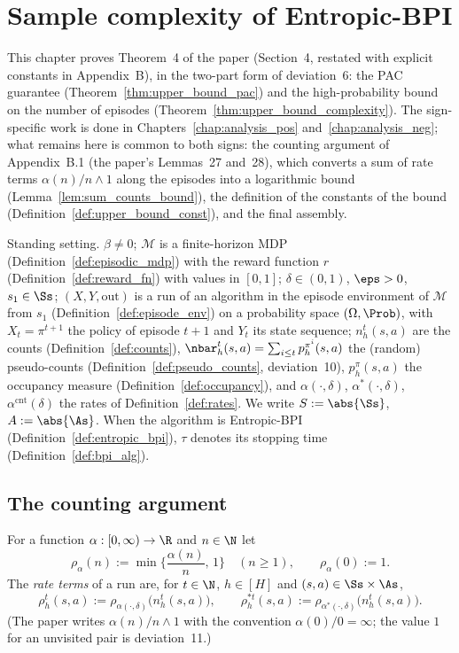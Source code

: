 \chapter{Sample complexity of Entropic-BPI}
\label{chap:sample_complexity}

This chapter proves Theorem~4 of the paper (Section~4, restated with explicit constants in
Appendix~B), in the two-part form of deviation~6: the PAC guarantee
(Theorem~\ref{thm:upper_bound_pac}) and the high-probability bound on the number of episodes
(Theorem~\ref{thm:upper_bound_complexity}). The sign-specific work is done in
Chapters~\ref{chap:analysis_pos} and~\ref{chap:analysis_neg}; what remains here is common to
both signs: the counting argument of Appendix~B.1 (the paper's Lemmas~27 and~28), which
converts a sum of rate terms $\alpha(n)/n \wedge 1$ along the episodes into a logarithmic
bound (Lemma~\ref{lem:sum_counts_bound}), the definition of the constants of the bound
(Definition~\ref{def:upper_bound_const}), and the final assembly.

Standing setting. $\beta \ne 0$; $\mathcal M$ is a finite-horizon MDP (Definition~\ref{def:episodic_mdp})
with the reward function $r$ (Definition~\ref{def:reward_fn}) with values in $[0,1]$;
$\delta \in (0,1)$, $\eps > 0$, $s_1 \in \Ss$; $(X, Y, \mathrm{out})$ is a run of an algorithm
in the episode environment of $\mathcal M$ from $s_1$ (Definition~\ref{def:episode_env}) on a
probability space $(\Omega, \Prob)$, with $X_t = \pi^{t+1}$ the policy of episode $t + 1$ and
$Y_t$ its state sequence; $n_h^t(s,a)$ are the counts (Definition~\ref{def:counts}),
$\nbar_h^t(s,a) = \sum_{i \le t} p^{\pi^i}_h(s,a)$ the (random) pseudo-counts
(Definition~\ref{def:pseudo_counts}, deviation~10), $p^\pi_h(s,a)$ the occupancy measure
(Definition~\ref{def:occupancy}), and $\alpha(\cdot,\delta)$, $\alpha^*(\cdot,\delta)$,
$\alpha^{\mathrm{cnt}}(\delta)$ the rates of Definition~\ref{def:rates}. We write $S := \abs{\Ss}$,
$A := \abs{\As}$. When the algorithm is Entropic-BPI (Definition~\ref{def:entropic_bpi}), $\tau$
denotes its stopping time (Definition~\ref{def:bpi_alg}).

\section{The counting argument}
\label{sec:sc_counting}

\begin{definition}\label{def:rate_min}
\leanok
{}
For a function $\alpha : [0, \infty) \to \R$ and $n \in \N$ let
\[
  \rho_\alpha(n) := \min\Big\{\frac{\alpha(n)}{n},\, 1\Big\} \quad (n \ge 1), \qquad \rho_\alpha(0) := 1 .
\]
The \emph{rate terms} of a run are, for $t \in \N$, $h \in [H]$ and $(s,a) \in \Ss\times\As$,
\[
  \rho^t_h(s,a) := \rho_{\alpha(\cdot,\delta)}\big(n_h^t(s,a)\big), \qquad
  \rho^{*t}_h(s,a) := \rho_{\alpha^*(\cdot,\delta)}\big(n_h^t(s,a)\big) .
\]
(The paper writes $\alpha(n)/n \wedge 1$ with the convention $\alpha(0)/0 = \infty$; the value
$1$ for an unvisited pair is deviation~11.)
\end{definition}

